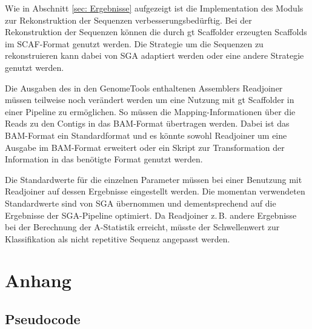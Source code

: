 \documentclass[a4paper,11pt,parskip]{scrartcl}
\begin{document}
Wie in Abschnitt \ref{sec: Ergebnisse} aufgezeigt ist die
Implementation des Moduls zur Rekonstruktion der Sequenzen
verbesserungsbedürftig. Bei der Rekonstruktion der Sequenzen können
die durch gt Scaffolder erzeugten Scaffolds im SCAF-Format genutzt
werden. Die Strategie um die Sequenzen zu rekonstruieren kann dabei
von SGA adaptiert werden oder eine andere Strategie genutzt werden.

Die Ausgaben des in den GenomeTools enthaltenen Assemblers Readjoiner
müssen teilweise noch verändert werden um eine Nutzung mit gt
Scaffolder in einer Pipeline zu ermöglichen. So müssen die
Mapping-Informationen über die Reads zu den Contigs in das BAM-Format
übertragen werden. Dabei ist das BAM-Format ein Standardformat und es
könnte sowohl Readjoiner um eine Ausgabe im BAM-Format erweitert oder
ein Skript zur Transformation der Information in das benötigte Format
genutzt werden.

Die Standardwerte für die einzelnen Parameter müssen bei einer
Benutzung mit Readjoiner auf dessen Ergebnisse eingestellt werden. Die
momentan verwendeten Standardwerte sind von SGA übernommen und
dementsprechend auf die Ergebnisse der SGA-Pipeline optimiert. Da
Readjoiner z.\,B. andere Ergebnisse bei der Berechnung der A-Statistik
erreicht, müsste der Schwellenwert zur Klassifikation als nicht
repetitive Sequenz angepasst werden.

\section*{Anhang}
\subsection*{Pseudocode}
\end{document}
